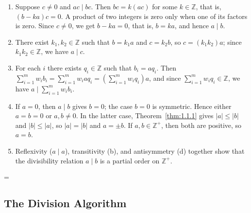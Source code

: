 \documentclass[11pt]{article}
\makeatletter
\theoremstyle{ntstyle}
\let\nt@closedisplay\]
\def\nt@guardedclose{\@ifnextchar\par{\nt@closeafterpar}{\@ifnextchar\end{\postdisplaypenalty\@M\nt@closedisplay}{\nt@closedisplay}}}
\def\nt@closeafterpar\par{\@ifnextchar\par{\nt@closeafterpar}{\@ifnextchar\end{\postdisplaypenalty\@M\nt@closedisplay\par}{\nt@closedisplay\par}}}
\renewenvironment{proof}[1][\proofname]{\par
  \pushQED{\qed}\normalfont\topsep\medskipamount\edef\nt@afterproof{\@endparpenalty=\the\@endparpenalty\relax}\@beginparpenalty\@M\@endparpenalty\@M\let\]\nt@guardedclose\trivlist\item[]\textit{#1\@addpunct{.}} \ignorespaces}{\ifvmode\addpenalty\@M\fi\popQED\nt@afterproof\endtrivlist\@endpefalse}
\makeatother
\begin{document}
\begin{proof}

	\begin{enumerate}[label={\alph*)}]
		\item Suppose $c \neq 0$ and $ac \mid bc$. Then $bc = k(ac)$ for
					some $k \in \mathbb{Z}$, that is, $(b - ka)c = 0$. A product of two integers is zero only when one of its
					factors is zero. Since $c \neq 0$, we get $b - ka = 0$, that is, $b = ka$, and hence $a \mid b$.
		\item There exist $k_1, k_2 \in \mathbb{Z}$ such that $b = k_1 a$
					and $c = k_2 b$, so $c = (k_1 k_2) a$; since $k_1 k_2 \in
						\mathbb{Z}$, we have $a \mid c$.
		\item For each $i$ there exists $q_i \in \mathbb{Z}$ such that
					$b_i = a q_i$. Then $\sum_{i=1}^{m} w_i b_i = \sum_{i=1}^{m} w_i a
						q_i = \left(\sum_{i=1}^{m} w_i q_i\right) a$, and since
					$\sum_{i=1}^{m} w_i q_i \in \mathbb{Z}$, we have $a \mid
						\sum_{i=1}^{m} w_i b_i$.
		\item If $a=0$, then $a\mid b$ gives $b=0$; the case $b=0$ is symmetric.
					Hence either $a=b=0$ or $a,b\neq0$. In the latter case, Theorem~\ref{thm:1.1.1} gives
					$|a| \le |b|$ and $|b| \le |a|$, so $|a| = |b|$ and $a = \pm b$.
					If $a, b \in \mathbb{Z}^+$, then both are positive, so $a = b$.
		\item Reflexivity ($a \mid a$), transitivity (b), and antisymmetry
					(d) together show that the divisibility relation $a \mid b$ is a partial order on
					$\mathbb{Z}^+$.\qedhere
	\end{enumerate}
\end{proof}
\subsection{The Division Algorithm}
\end{document}
